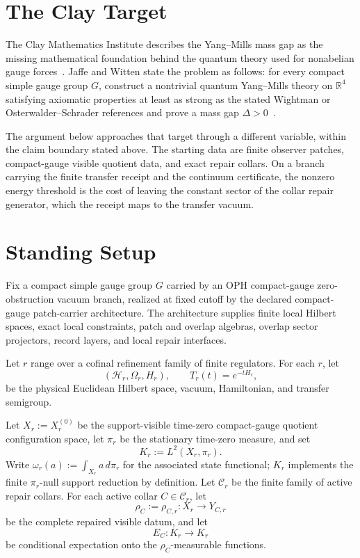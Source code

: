 \documentclass[11pt]{article}
\numberwithin{equation}{section}
\theoremstyle{remark}
\newcommand{\Hcal}{\mathcal H}
\newcommand{\R}{\mathbb R}
\begin{document}
\section{The Clay Target}

The Clay Mathematics Institute describes the Yang--Mills mass gap as the missing mathematical
foundation behind the quantum theory used for nonabelian gauge forces~\cite{clay}. Jaffe and
Witten state the problem as follows: for every compact simple gauge group \(G\), construct a
nontrivial quantum Yang--Mills theory on \(\R^4\) satisfying axiomatic properties at least as
strong as the stated Wightman or Osterwalder--Schrader references and prove a mass gap
\(\Delta>0\)~\cite{jaffe-witten,clay-mpp}.

The argument below approaches that target through a different variable, within the claim boundary stated above. The starting data are finite observer patches,
compact-gauge visible quotient data, and exact repair collars. On a branch carrying the finite
transfer receipt and the continuum certificate, the nonzero energy threshold is the cost of leaving
the constant sector of the collar repair generator, which the receipt maps to the transfer vacuum.

\section{Standing Setup}

Fix a compact simple gauge group \(G\) carried by an OPH compact-gauge zero-obstruction vacuum
branch, realized at fixed cutoff by the declared compact-gauge patch-carrier architecture. The
architecture supplies finite local Hilbert spaces, exact local constraints, patch and overlap
algebras, overlap sector projectors, record layers, and local repair interfaces.

Let \(r\) range over a cofinal refinement family of finite regulators. For each \(r\), let
\[
(\Hcal_r,\Omega_r,H_r),
\qquad
T_r(t)=e^{-tH_r},
\]
be the physical Euclidean Hilbert space, vacuum, Hamiltonian, and transfer semigroup.

Let \(X_r:=X_r^{(0)}\) be the support-visible time-zero compact-gauge quotient configuration
space, let \(\pi_r\) be the stationary time-zero measure, and set
\[
K_r:=L^2(X_r,\pi_r).
\]
Write \(\omega_r(a):=\int_{X_r}a\,d\pi_r\) for the associated state functional; \(K_r\)
implements the finite \(\pi_r\)-null support reduction by definition.
Let \(\mathcal C_r\) be the finite family of active repair collars. For each active collar
\(C\in\mathcal C_r\), let
\[
\rho_C:=\rho_{C,r}:X_r\to Y_{C,r}
\]
be the complete repaired visible datum, and let
\[
E_C:K_r\to K_r
\]
be conditional expectation onto the \(\rho_C\)-measurable functions.
\end{document}
